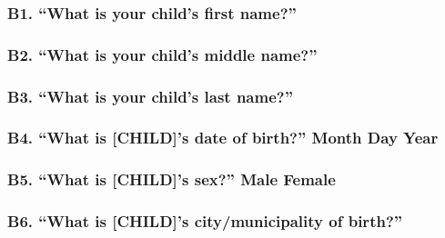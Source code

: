 \documentclass[
  12pt,
]{book}
\begin{document}
\hypertarget{b1.-what-is-your-childs-first-name}{%
\subsubsection*{B1. ``What is your child's first name?''}\label{b1.-what-is-your-childs-first-name}}

\hypertarget{b2.-what-is-your-childs-middle-name}{%
\subsubsection*{B2. ``What is your child's middle name?''}\label{b2.-what-is-your-childs-middle-name}}

\hypertarget{b3.-what-is-your-childs-last-name}{%
\subsubsection*{B3. ``What is your child's last name?''}\label{b3.-what-is-your-childs-last-name}}

\hypertarget{b4.-what-is-childs-date-of-birth-month-day-year}{%
\subsubsection*{B4. ``What is {[}CHILD{]}'s date of birth?'' Month Day Year}\label{b4.-what-is-childs-date-of-birth-month-day-year}}

\hypertarget{b5.-what-is-childs-sex-male-female}{%
\subsubsection*{B5. ``What is {[}CHILD{]}'s sex?'' Male Female}\label{b5.-what-is-childs-sex-male-female}}

\hypertarget{b6.-what-is-childs-citymunicipality-of-birth}{%
\subsubsection*{B6. ``What is {[}CHILD{]}'s city/municipality of birth?''}\label{b6.-what-is-childs-citymunicipality-of-birth}}
\end{document}
